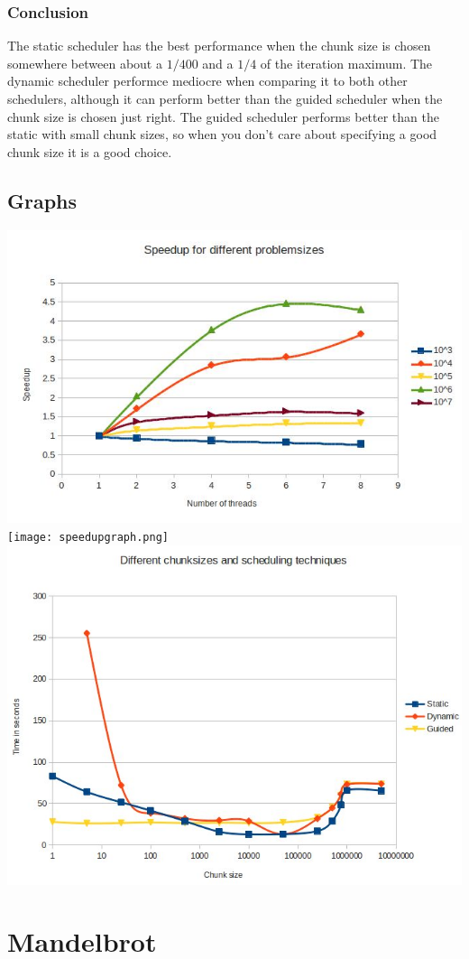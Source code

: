 \documentclass[12pt]{article}
\begin{document}
\subsubsection{Conclusion}
The static scheduler has the best performance when the chunk size is chosen somewhere between about a $1/400$ and a $1/4$ of the iteration maximum. The dynamic scheduler performce mediocre when comparing it to both other schedulers, although it can perform better than the guided scheduler when the chunk size is chosen just right. The guided scheduler performs better than the static with small chunk sizes, so when you don't care about specifying a good chunk size it is a good choice.

\clearpage
\subsection{Graphs}
\includegraphics[width=\textwidth]{threads.jpg}
\texttt{[image: speedupgraph.png]}
\includegraphics[width=\textwidth]{chunks.jpg}
\section{Mandelbrot}
\end{document}
